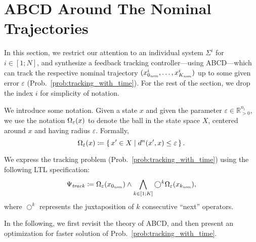 \section{ABCD Around The Nominal Trajectories}\label{sec:tracking}

In this section, we restrict our attention to an individual system $\Sigma^i$ for $i\in [1;N]$, and synthesize a feedback tracking controller---using ABCD---which can track the respective nominal trajectory $(x_{0_{\mathit{nom}}}^i,\ldots,x_{K_{\mathit{nom}}}^i)$ up to some given error $\varepsilon$ (Prob.~\ref{prob:tracking_with_time}).
For the rest of the section, we drop the index $i$ for simplicity of notation.

We introduce some notation.
Given a state $x$ and given the parameter $\varepsilon\in \mathbb{R}_{>0}^{n_i}$, we use the notation $\Omega_\varepsilon( x)$ to denote the ball in the state space $X$, centered around $x$ and having radius $\varepsilon$.
Formally, \[\Omega_\varepsilon(x)\coloneqq \set{x'
	\in X \mid  d^n(x',x)\leq \varepsilon }.\] 

We express the tracking problem (Prob.~\ref{prob:tracking_with_time}) using the following LTL specification:
\begin{align}
	\label{eq:ltl_spec}
	\Psi_{\mathit{track}}\coloneqq \Omega_\varepsilon(x_{0_{\mathit{nom}}}) \wedge \bigwedge_{k\in [1;K]} \bigcirc^k \Omega_\varepsilon(x_{k_{\mathit{nom}}}),
\end{align}
where $\bigcirc^k$ represents the juxtaposition of $k$ consecutive ``next'' operators.

In the following, we first revisit the theory of ABCD, and then present an optimization for faster solution of Prob.~\ref{prob:tracking_with_time}.
 
 \begin{comment}
The specification $\Psi_\track$ in general requires controller with memory, as we show in the following example.

\begin{example}
	Consider the one-dimensional control system $(\mathbb{R},\set{0,+1}, \emptyset, f)$ with the following dynamics:
	\begin{align*}
		\dot{\xi} = f(\xi,u) = u.
	\end{align*}
	Let the sampling time be $1$, the nominal trajectory be $(0,1,0,-1)$, and 
\end{example}
\end{comment}

